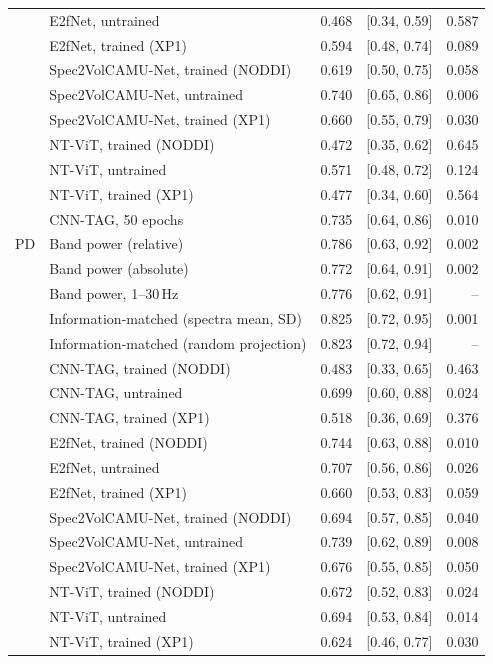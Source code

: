 \documentclass[10pt]{article}
\begin{document}
\begin{longtable}{l l r c r}
 & E2fNet, untrained & 0.468 & [0.34, 0.59] & 0.587 \\
 & E2fNet, trained (XP1) & 0.594 & [0.48, 0.74] & 0.089 \\
 & Spec2VolCAMU-Net, trained (NODDI) & 0.619 & [0.50, 0.75] & 0.058 \\
 & Spec2VolCAMU-Net, untrained & 0.740 & [0.65, 0.86] & 0.006 \\
 & Spec2VolCAMU-Net, trained (XP1) & 0.660 & [0.55, 0.79] & 0.030 \\
 & NT-ViT, trained (NODDI) & 0.472 & [0.35, 0.62] & 0.645 \\
 & NT-ViT, untrained & 0.571 & [0.48, 0.72] & 0.124 \\
 & NT-ViT, trained (XP1) & 0.477 & [0.34, 0.60] & 0.564 \\
 & CNN-TAG, 50 epochs & 0.735 & [0.64, 0.86] & 0.010 \\
\midrule
PD & Band power (relative) & 0.786 & [0.63, 0.92] & 0.002 \\
 & Band power (absolute) & 0.772 & [0.64, 0.91] & 0.002 \\
 & Band power, 1--30\,Hz & 0.776 & [0.62, 0.91] & -- \\
 & Information-matched (spectra mean, SD) & 0.825 & [0.72, 0.95] & 0.001 \\
 & Information-matched (random projection) & 0.823 & [0.72, 0.94] & -- \\
 & CNN-TAG, trained (NODDI) & 0.483 & [0.33, 0.65] & 0.463 \\
 & CNN-TAG, untrained & 0.699 & [0.60, 0.88] & 0.024 \\
 & CNN-TAG, trained (XP1) & 0.518 & [0.36, 0.69] & 0.376 \\
 & E2fNet, trained (NODDI) & 0.744 & [0.63, 0.88] & 0.010 \\
 & E2fNet, untrained & 0.707 & [0.56, 0.86] & 0.026 \\
 & E2fNet, trained (XP1) & 0.660 & [0.53, 0.83] & 0.059 \\
 & Spec2VolCAMU-Net, trained (NODDI) & 0.694 & [0.57, 0.85] & 0.040 \\
 & Spec2VolCAMU-Net, untrained & 0.739 & [0.62, 0.89] & 0.008 \\
 & Spec2VolCAMU-Net, trained (XP1) & 0.676 & [0.55, 0.85] & 0.050 \\
 & NT-ViT, trained (NODDI) & 0.672 & [0.52, 0.83] & 0.024 \\
 & NT-ViT, untrained & 0.694 & [0.53, 0.84] & 0.014 \\
 & NT-ViT, trained (XP1) & 0.624 & [0.46, 0.77] & 0.030 \\

\end{longtable}
\end{document}
